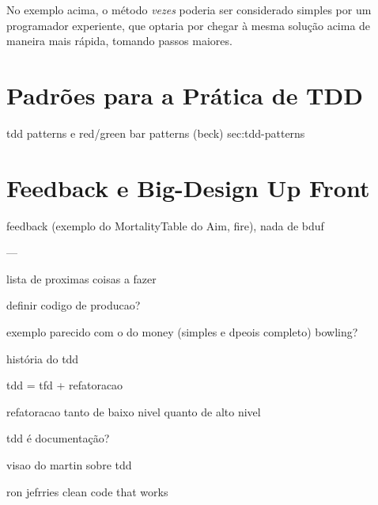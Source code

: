 No exemplo acima, o método \textit{vezes} poderia ser considerado simples por um programador experiente, que optaria por chegar à
mesma solução acima de maneira mais rápida, tomando passos maiores.

\section{Padrões para a Prática de TDD}
\label{sec:tdd-patterns}

tdd patterns e red/green bar patterns (beck) sec:tdd-patterns

\section{Feedback e Big-Design Up Front}

feedback (exemplo do MortalityTable do Aim, fire), nada de bduf

---



lista de proximas coisas a fazer

definir codigo de producao?

exemplo parecido com o do money (simples e dpeois completo) bowling?

história do tdd

tdd = tfd + refatoracao

refatoracao tanto de baixo nivel quanto de alto nivel

tdd é documentação?

visao do martin sobre tdd

ron jefrries clean code that works

